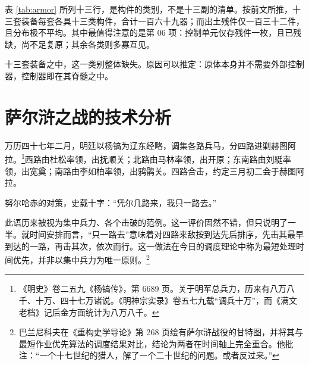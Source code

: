 表 \ref{tab:armor} 所列十三行，是构件的类别，不是十三副的清单。按前文所推，十三套装备每套各具十三类构件，合计一百六十九器；而出土残件仅一百三十二件，且分布极不平均。其中最值得注意的是第 06 项：控制单元仅存残件一枚，且已残缺，尚不足复原；其余各类则多寡互见。

十三套装备之中，这一类别整体缺失。原因可以推定：原体本身并不需要外部控制器，控制器即在其脊髓之中。

\section{萨尔浒之战的技术分析}

万历四十七年二月，明廷以杨镐为辽东经略，调集各路兵马，分四路进剿赫图阿拉。\footnote{《明史》卷二五九《杨镐传》，第 6689 页。关于明军总兵力，历来有八万八千、十万、四十七万诸说。《明神宗实录》卷五七九载“调兵十万”，而《满文老档》记后金方面统计为八万八千。}西路由杜松率领，出抚顺关；北路由马林率领，出开原；东南路由刘綎率领，出宽奠；南路由李如柏率领，出鸦鹘关。四路合击，约定三月初二会于赫图阿拉。

努尔哈赤的对策，史载十字：“凭尔几路来，我只一路去。”

此语历来被视为集中兵力、各个击破的范例。这一评价固然不错，但只说明了一半。就时间安排而言，“只一路去”意味着对四路来敌按到达先后排序，先击其最早到达的一路，再击其次，依次而行。这一做法在今日的调度理论中称为最短处理时间优先，并非以集中兵力为唯一原则。\footnote{巴兰尼科夫在《重构史学导论》第 268 页绘有萨尔浒战役的甘特图，并将其与最短作业优先算法的调度结果对比，结论为两者在时间轴上完全重合。他批注：“一个十七世纪的猎人，解了一个二十世纪的问题。或者反过来。”}

